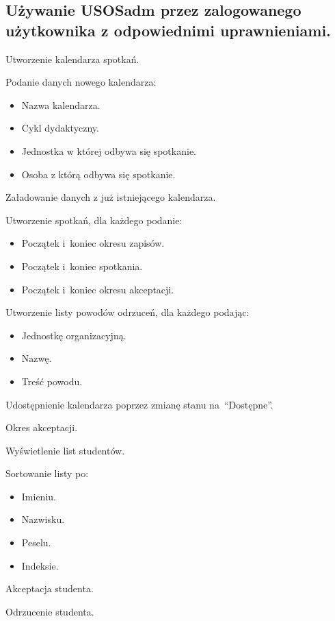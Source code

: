 \documentclass[licencjacka]{pracamgr}
\begin{document}
\subsection{Używanie USOSadm przez zalogowanego użytkownika z odpowiednimi uprawnieniami.}
	\begin{step}
		\item Utworzenie kalendarza spotkań.
			\begin{step}
				\item Podanie danych nowego kalendarza:
					\begin{itemize}
						\item Nazwa kalendarza.
						\item Cykl dydaktyczny.
						\item Jednostka w której odbywa się spotkanie.
						\item Osoba z którą odbywa się spotkanie.
					\end{itemize} 
				\item Załadowanie danych z już istniejącego kalendarza.
			\end{step}
				\item Utworzenie spotkań, dla każdego podanie:
					\begin{itemize}
						\item Początek i~koniec okresu zapisów.
						\item Początek i~koniec spotkania.
						\item Początek i~koniec okresu akceptacji.
					\end{itemize}
				\item Utworzenie listy powodów odrzuceń, dla każdego podając:
					\begin{itemize}
						\item Jednostkę organizacyjną.
						\item Nazwę.
						\item Treść powodu.
					\end{itemize}
		\item Udostępnienie kalendarza poprzez zmianę stanu na~\enquote{Dostępne}.
		\item Okres akceptacji.
			\begin{step}
				\item Wyświetlenie list studentów.
					\begin{step}
						\item Sortowanie listy po:
							\begin{itemize}
								\item Imieniu.
								\item Nazwisku.
								\item Peselu.
								\item Indeksie.
						 	\end{itemize}
					\end{step}
				\item Akceptacja studenta.
				\item Odrzucenie studenta. 
			\end{step}
	\end{step}
	
\end{document}
